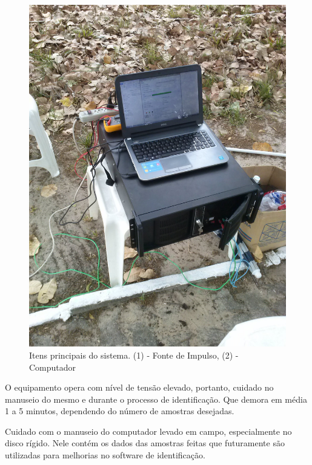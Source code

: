 \documentclass[a4paper, 10pt]{article}
\begin{document}
\begin{figure}[!h]
        \caption{\label{fig_fonte}Itens principais do sistema. (1) - Fonte de Impulso, (2) - Computador}
	    \begin{center}
	        \includegraphics[scale=0.1]{../fotos/CAM00189.jpg}
	    \end{center}
\end{figure}

O equipamento opera com nível de tensão elevado, portanto, cuidado no 
manuseio do mesmo e durante o processo de identificação. Que demora em
média
1 a 5 minutos, dependendo do número de amostras desejadas.

Cuidado com o manuseio do computador levado em campo, especialmente 
no disco rígido. Nele contém os dados das amostras feitas que futuramente
são utilizadas para melhorias no software de identificação. 
\end{document}
